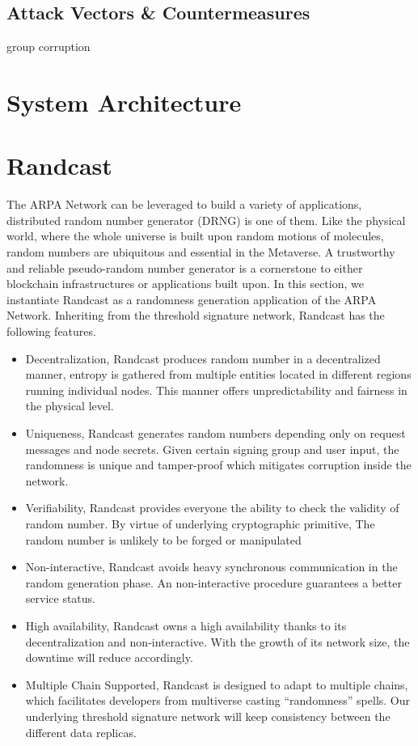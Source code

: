 \documentclass[11pt]{article}
\begin{document}
\subsection{Attack Vectors \& Countermeasures}

group corruption


\section{System Architecture}


\section{Randcast}

The ARPA Network can be leveraged to build a variety of applications, distributed random number generator (DRNG) is one of them. Like the physical world, where the whole universe is built upon random motions of molecules, random numbers are ubiquitous and essential in the Metaverse. A trustworthy and reliable pseudo-random number generator is a cornerstone to either blockchain infrastructures or applications built upon. In this section, we instantiate Randcast as a randomness generation application of the ARPA Network. Inheriting from the threshold signature network, Randcast has the following features.

\begin{itemize}
    \item Decentralization, Randcast produces random number in a decentralized manner, entropy is gathered from multiple entities located in different regions running individual nodes. This manner offers unpredictability and fairness in the physical level.
    \item Uniqueness, Randcast generates random numbers depending only on request messages and node secrets. Given certain signing group and user input, the randomness is unique and tamper-proof which mitigates corruption inside the network.
    \item Verifiability, Randcast provides everyone the ability to check the validity of random number. By virtue of underlying cryptographic primitive, The random number is unlikely to be forged or manipulated
    \item Non-interactive, Randcast avoids heavy synchronous communication in the random generation phase. An non-interactive procedure guarantees a better service status.
    \item High availability, Randcast owns a high availability thanks to its decentralization and non-interactive. With the growth of its network size, the downtime will reduce accordingly.
    \item Multiple Chain Supported, Randcast is designed to adapt to multiple chains, which facilitates developers from multiverse casting “randomness” spells. Our underlying threshold signature network will keep consistency between the different data replicas.
\end{itemize}
\end{document}
